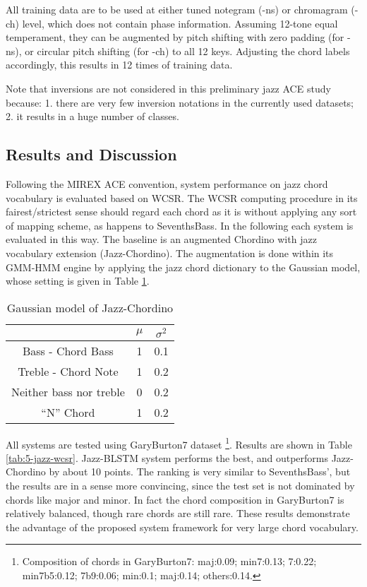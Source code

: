 All training data are to be used at either tuned notegram (-ns) or chromagram (-ch) level, which does not contain phase information. Assuming 12-tone equal temperament, they can be augmented by pitch shifting with zero padding (for -ns), or circular pitch shifting (for -ch) to all 12 keys. Adjusting the chord labels accordingly, this results in 12 times of training data.

Note that inversions are not considered in this preliminary jazz ACE study because: 1. there are very few inversion notations in the currently used datasets; 2. it results in a huge number of classes.

\subsection{Results and Discussion}
Following the MIREX ACE convention, system performance on jazz chord vocabulary is evaluated based on WCSR. The WCSR computing procedure in its fairest/strictest sense should regard each chord as it is without applying any sort of mapping scheme, as happens to SeventhsBass. In the following each system is evaluated in this way. The baseline is an augmented Chordino with jazz vocabulary extension (Jazz-Chordino). The augmentation is done within its GMM-HMM engine by applying the jazz chord dictionary to the Gaussian model, whose setting is given in Table \ref{tab:5-jcgau}.
\begin{table}[h]
\centering
\footnotesize
\begin{tabular}{|c|c|c|} \hline
      & $\mu$ & $\sigma^2$ \\ \hline
Bass - Chord Bass & 1 & 0.1 \\ \hline
Treble - Chord Note & 1 & 0.2  \\ \hline
Neither bass nor treble & 0 & 0.2 \\ \hline
 ``N'' Chord  & 1 & 0.2  \\ \hline
\end{tabular}
\caption{Gaussian model of Jazz-Chordino}
\label{tab:5-jcgau}
\end{table}

All systems are tested using GaryBurton7 dataset \footnote{Composition of chords in GaryBurton7: maj:0.09; min7:0.13; 7:0.22; min7b5:0.12; 7b9:0.06; min:0.1; maj:0.14; others:0.14.}. Results are shown in Table \ref{tab:5-jazz-wcsr}. Jazz-BLSTM system performs the best, and outperforms Jazz-Chordino by about 10 points. The ranking is very similar to SeventhsBass', but the results are in a sense more convincing, since the test set is not dominated by chords like major and minor. In fact the chord composition in GaryBurton7 is relatively balanced, though rare chords are still rare. These results demonstrate the advantage of the proposed system framework for very large chord vocabulary.

